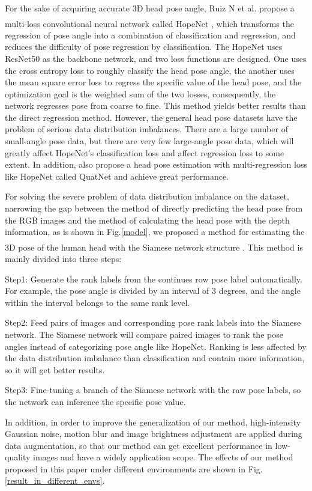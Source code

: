 \documentclass[english]{DDCLSconf}
\newcommand{\upcite}[1]{\textsuperscript{\textsuperscript{\cite{#1}}}}%
\begin{document}
For the sake of acquiring accurate 3D head pose angle, Ruiz N et al. propose a multi-loss convolutional neural network called HopeNet \upcite{hopenet}, which transforms the regression of pose angle into a combination of classification and regression, and reduces the difficulty of pose regression by classification. The HopeNet uses ResNet50 as the backbone network, and two loss functions are designed. One uses the cross entropy loss to roughly classify the head pose angle, the another uses the mean square error loss to regress the specific value of the head pose, and the optimization goal is the weighted sum of the two losses, consequently, the network regresses pose from coarse to fine. This method yields better results than the direct regression method. However, the general head pose datasets have the problem of serious data distribution imbalances. There are a large number of small-angle pose data, but there are very few large-angle pose data, which will greatly affect HopeNet's classification loss and affect regression loss to some extent. In addition, \cite{quatnet} also propose a head pose estimation with multi-regression loss like HopeNet called QuatNet and achieve great performance.

For solving the severe problem of data distribution imbalance on the dataset, narrowing the gap between the method of directly predicting the head pose from the RGB images and the method of calculating the head pose with the depth information, as is shown in Fig.\ref{model}, we proposed a method for estimating the 3D pose of the human head with the Siamese network structure \upcite{siamese}. This method is mainly divided into three steps:
 
Step1: Generate the rank labels from the continues row pose label automatically. For example, the pose angle is divided by an interval of 3 degrees, and the angle within the interval belongs to the same rank level. 

Step2: Feed pairs of images and corresponding pose rank labels into the Siamese network. The Siamese network will compare paired images to rank the pose angles instead of categorizing pose angle like HopeNet. Ranking is less affected by the data distribution imbalance than classification and contain more information, so it will get better results. 

Step3: Fine-tuning a branch of the Siamese network with the raw pose labels, so the network can inference the specific pose value. 

In addition, in order to improve the generalization of our method, high-intensity Gaussian noise, motion blur and image brightness adjustment are applied during data augmentation, so that our method can get excellent performance in low-quality images and have a widely application scope. The effects of our method proposed in this paper under different environments are shown in Fig.\ref{result_in_different_envs}.
\end{document}
